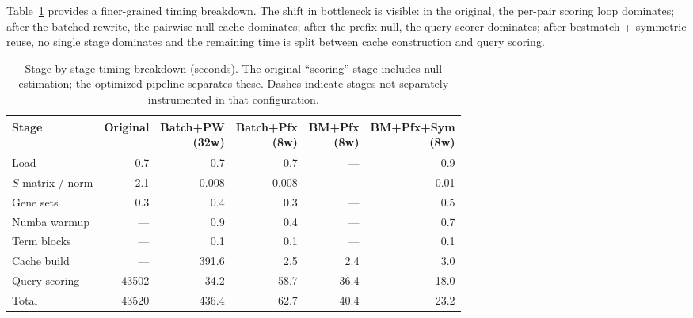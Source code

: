 \documentclass[11pt,a4paper]{article}
\begin{document}
Table~\ref{tab:breakdown} provides a finer-grained timing breakdown. The
shift in bottleneck is visible: in the original, the per-pair scoring loop
dominates; after the batched rewrite, the pairwise null cache dominates;
after the prefix null, the query scorer dominates; after bestmatch +
symmetric reuse, no single stage dominates and the remaining time is split
between cache construction and query scoring.

\begin{table}[H]
	\centering
	\caption{Stage-by-stage timing breakdown (seconds). The original ``scoring''
		stage includes null estimation; the optimized pipeline separates these.
		Dashes indicate stages not separately instrumented in that configuration.}
	\label{tab:breakdown}
	\smallskip
	\small
	\setlength{\tabcolsep}{5pt}
	\begin{tabular}{@{}lrrrrr@{}}
		\toprule
		Stage                        & Original                  & \shortstack{Batch+PW\\(32w)} &
		\shortstack{Batch+Pfx\\(8w)} & \shortstack{BM+Pfx\\(8w)} &
		\shortstack{BM+Pfx+Sym\\(8w)}                                                                                 \\
		\midrule
		Load                         & 0.7                       & 0.7                          & 0.7   & ---  & 0.9  \\
		$S$-matrix / norm            & 2.1                       & 0.008                        & 0.008 & ---  & 0.01 \\
		Gene sets                    & 0.3                       & 0.4                          & 0.3   & ---  & 0.5  \\
		Numba warmup                 & ---                       & 0.9                          & 0.4   & ---  & 0.7  \\
		Term blocks                  & ---                       & 0.1                          & 0.1   & ---  & 0.1  \\
		Cache build                  & ---                       & 391.6                        & 2.5   & 2.4  & 3.0  \\
		Query scoring                & \num{43502}               & 34.2                         & 58.7  & 36.4 & 18.0 \\
		\midrule
		Total                        & \num{43520}               & 436.4                        & 62.7  & 40.4 & 23.2 \\
		\bottomrule
	\end{tabular}
\end{table}
\end{document}
